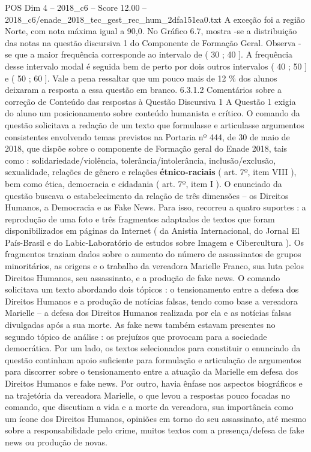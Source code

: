 \begin{textsample}{POS Dim 4 – 2018\_c6 – Score 12.00 – 2018\_c6/enade\_2018\_tec\_gest\_rec\_hum\_2dfa151ea0.txt}
A exceção foi a região Norte, com nota máxima igual a 90,0.
No Gráfico 6.7, mostra -se a distribuição das notas na questão discursiva 1 do Componente de Formação Geral.
Observa -se que a maior frequência corresponde ao intervalo de ( 30 ; 40 ].
A frequência desse intervalo modal é seguida bem de perto por dois outros intervalos ( 40 ; 50 ] e ( 50 ; 60 ].
Vale a pena ressaltar que um pouco mais de 12 \% dos alunos deixaram a resposta a essa questão em branco. 6.3.1.2 Comentários sobre a correção de Conteúdo das respostas à Questão Discursiva 1 A Questão 1 exigia do aluno um posicionamento sobre conteúdo humanista e crítico.
O comando da questão solicitava a redação de um texto que formulasse e articulasse argumentos consistentes envolvendo temas previstos na Portaria nº 444, de 30 de maio de 2018, que dispõe sobre o componente de Formação geral do Enade 2018, tais como : solidariedade/violência, tolerância/intolerância, inclusão/exclusão, sexualidade, relações de gênero e relações \textbf{étnico-raciais} ( art. 7º, item VIII ), bem como ética, democracia e cidadania ( art. 7º, item I ).
O enunciado da questão buscava o estabelecimento da relação de três dimensões – os Direitos Humanos, a Democracia e as Fake News.
Para isso, recorreu a quatro suportes : a reprodução de uma foto e três fragmentos adaptados de textos que foram disponibilizados em páginas da Internet ( da Anistia Internacional, do Jornal El País-Brasil e do Labic-Laboratório de estudos sobre Imagem e Cibercultura ).
Os fragmentos traziam dados sobre o aumento do número de assassinatos de grupos minoritários, as origens e o trabalho da vereadora Marielle Franco, sua luta pelos Direitos Humanos, seu assassinato, e a produção de fake news.
O comando solicitava um texto abordando dois tópicos : o tensionamento entre a defesa dos Direitos Humanos e a produção de notícias falsas, tendo como base a vereadora Marielle – a defesa dos Direitos Humanos realizada por ela e as notícias falsas divulgadas após a sua morte.
As fake news também estavam presentes no segundo tópico de análise : os prejuízos que provocam para a sociedade democrática.
Por um lado, os textos selecionados para constituir o enunciado da questão continham apoio suficiente para formulação e articulação de argumentos para discorrer sobre o tensionamento entre a atuação da Marielle em defesa dos Direitos Humanos e fake news.
Por outro, havia ênfase nos aspectos biográficos e na trajetória da vereadora Marielle, o que levou a respostas pouco focadas no comando, que discutiam a vida e a morte da vereadora, sua importância como um ícone dos Direitos Humanos, opiniões em torno do seu assassinato, até mesmo sobre a responsabilidade pelo crime, muitos textos com a presença/defesa de fake news ou produção de novas.

\end{textsample}
